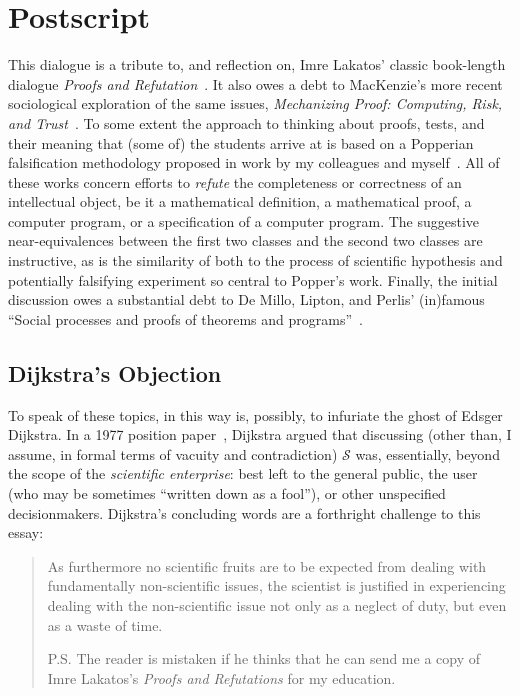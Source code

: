 \documentclass[sigplan]{acmart}
\begin{document}
\section{Postscript}

This dialogue is a tribute to, and reflection on, Imre Lakatos'
classic book-length dialogue
 \emph{Proofs and Refutation}~\cite{lakatos1963proofs}.  It also
owes a debt to MacKenzie's more recent sociological exploration of the
same issues, \emph{Mechanizing
  Proof: Computing, Risk, and Trust}~\cite{mackenzie2004mechanizing}.
To some extent the approach to thinking about proofs, tests, and their
meaning that (some of) the students arrive at is based on a Popperian~\cite{Popper} falsification methodology proposed in
work by my colleagues and
myself~\cite{groce2015verified,groce2018verified}.  All of these works
concern efforts to \emph{refute} the completeness or correctness of an
intellectual object, be it a mathematical definition, a mathematical
proof, a computer program, or a specification of a computer program.
The suggestive near-equivalences between the first two classes and the second two
classes are instructive, as is the similarity of both to the process of
scientific hypothesis and potentially falsifying experiment so central
to Popper's work.
Finally, the initial discussion owes a substantial debt to De Millo, Lipton, and
Perlis' (in)famous ``Social processes and proofs of theorems and
programs''~\cite{de1979social}.

\subsection{Dijkstra's Objection}

To speak of these topics, in this way is, possibly, to infuriate the
ghost of Edsger Dijkstra.  In a 1977 position paper~\cite{dijkstra1977position}, Dijkstra argued
that discussing (other than, I assume, in formal terms of vacuity and
contradiction) $\mathcal{S}$ was, essentially, beyond the scope of the
\emph{scientific enterprise}:  best left to the general public, the
user (who may be sometimes ``written down as a fool''), or other
unspecified decisionmakers.  Dijkstra's concluding words are a
forthright challenge to this essay:

\begin{quote}
  As furthermore no scientific fruits are to be expected from dealing with fundamentally non-scientific issues, the scientist is justified in experiencing dealing with the non-scientific issue not only as a neglect of duty, but even as a waste of time.

P.S. The reader is mistaken if he thinks that he can send me a copy of Imre Lakatos’s \emph{Proofs and Refutations} for my education.
\end{quote}
\end{document}
